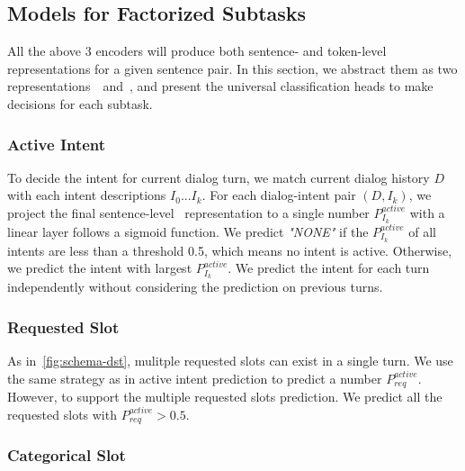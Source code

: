 \subsection{Models for Factorized Subtasks}
\label{ssec:models-overview}
All the above 3 encoders will produce both sentence- and token-level
representations for a given sentence pair. In this section,
we abstract them as two representations~\CLS~and~\TOK, and present the
universal classification heads to make decisions for each subtask.

\subsubsection{Active Intent}
\label{sssec:sgd:active-intent}

To decide the intent for current dialog turn, we match current dialog
history $D$ with each intent descriptions $I_{0}...I_{k}$. For each
dialog-intent pair $(D,I_{k})$, we project the final sentence-level
\CLS~representation to a single number $P_{I_{k}}^{active}$ with a
linear layer follows a sigmoid function. We predict \textit{"NONE"} if
the $P_{I_{k}}^{active}$ of all intents are less than a threshold 0.5,
which means no intent is active. Otherwise, we predict the intent with
largest $P_{I_{k}}^{active}$. We predict the intent for each turn
independently without considering the prediction on previous turns.

\subsubsection{Requested Slot}
\label{sssec:sgd:requested-slot}

As in~\autoref{fig:schema-dst}, mulitple requested slots can exist
in a single turn. We use the same strategy as in active intent
prediction to predict a number $P_{req}^{active}$. However, to support
the multiple requested slots prediction. We predict all the requested
slots with $P_{req}^{active} > 0.5$.

\subsubsection{Categorical Slot}
\label{sssec:sgd:categorical-slot}

